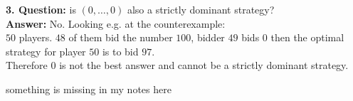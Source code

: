 \begin{example}
	\textbf{3. Question:} is $(0, \dotsc, 0)$ also a strictly dominant strategy? \\
	\textbf{Answer:} No. Looking e.g. at the counterexample: \\
	$50$ players. $48$ of them bid the number $100$, bidder $49$ bids $0$ then the optimal strategy for player $50$ is to bid $97$. \\
	Therefore $0$ is not the best answer and cannot be a strictly dominant strategy.
\end{example}

\begin{example}
	something is missing in my notes here %
\end{example}

\newpage